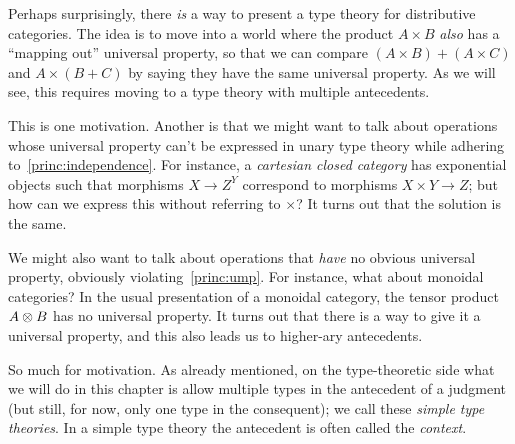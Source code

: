 Perhaps surprisingly, there \emph{is} a way to present a type theory for distributive categories.
The idea is to move into a world where the product $A\times B$ \emph{also} has a ``mapping out'' universal property, so that we can compare $(A\times B)+(A\times C)$ and $A\times (B+C)$ by saying they have the same universal property.
As we will see, this requires moving to a type theory with multiple antecedents.

This is one motivation.
Another is that we might want to talk about operations whose universal property can't be expressed in unary type theory while adhering to~\eqref{princ:independence}.
For instance, a \emph{cartesian closed category} has exponential objects such that morphisms $X\to Z^Y$ correspond to morphisms $X\times Y\to Z$; but how can we express this without referring to $\times$?
It turns out that the solution is the same.

We might also want to talk about operations that \emph{have} no obvious universal property, obviously violating~\eqref{princ:ump}.
For instance, what about monoidal categories?
In the usual presentation of a monoidal category, the tensor product $A\otimes B$ has no universal property.
It turns out that there is a way to give it a universal property, and this also leads us to higher-ary antecedents.


So much for motivation.
As already mentioned, on the type-theoretic side what we will do in this chapter is allow multiple types in the antecedent of a judgment (but still, for now, only one type in the consequent); we call these \emph{simple type theories}.
In a simple type theory the antecedent is often called the \emph{context}.

